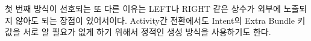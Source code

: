 첫 번째 방식이 선호되는 또 다른 이유는 LEFT나 RIGHT 같은 상수가 외부에 노출되지 않아도 되는 장점이 있어서이다. Activity간 전환에서도 Intent의 Extra Bundle 키 값을 서로 알 필요가 없게 하기 위해서 정적인 생성 방식을 사용하기도 한다.

\begin{comment}
\subsubsection{하위 클래스에서 boolean 리턴 메서드 오버라이드}
boolean을 리턴하는 메서드를 쓰는 것도 비슷하긴 하다.
 
상위 클래스에서 아래와 같이 사용한다.
	
\begin{lstlisting}[frame=single] 
	public void execute() {
		if (isAttribute1()) {
 			someOperationW();
		}
		...
	}
 
	protected boolean isAttribute1() {
		return false;
	}
\end{lstlisting}
 
하위 클래스에서 isAttributeA() 메서드를 필요할 때 오버라이드 하는 방식이다.
나도 이 방법을 쓰는 경우가 있긴 한데, marker interface는 좀 더 복잡한 케이스에 더 맞는다.\\

경우를 좀 생각해보자.
해야 할 if  문이 10개라고 하면 10개의 boolean을 리턴하는 메서드가 필요해진다.
하위 클래스에서는 어느 것에 true이고, 어느 것에 false인지를 정해주면 되는데, 갯수가 많아지면, 나중에 정책이 바뀔 때 작업에서 혼돈이 있지 않을까.\\
 
한 가지 비유를 생각해보았다.
10권의 지정된 책이 있다. 내가 속한 조직의 구성원들한테, 각 책을 갖고 있는지 여부에 따라서 뭔가를 해주고 싶다. 책을 사준다든가, 교육을 보내준다든가 하는 게 있을 것이다.\\
 
이때 각각의 boolean 리턴 메서드를 만들 수 있다. hasEffectiveJava(), hasAndroidHacks(), ...
각 구성원 클래스는 이것을 오버라이드 해서 갖고 있는 책에다 true를 리턴하게 하면 된다.\\

그런데 어느날 책 장터가 열려서 각자 갖고 있는 책들이 다 바뀌어 버렸다.
이때 또 각각 찾아서 true/false를 바꿔주면 된다.\\
 
그런데 이런 경우에 이게 더 쉽지 않을까? 책1 가지고 있는지, 책2 가지고 있는지 계속 묻는 거 보다, 자기가 갖고 있는 책만 나열하라고 하는 것이다.
boolean 메서드를 쓰는 방식이 책 각각에 대해서 묻는 것이고, marker interface를 쓰는 건 갖고 있는 것만 나열하는 방식이다.\\
 

\end{comment}
